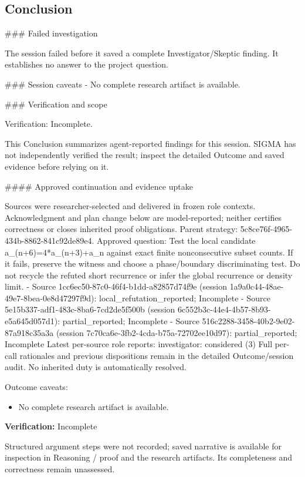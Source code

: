 \documentclass[11pt]{article}
\begin{document}
\subsection{Conclusion}
\#\#\# Failed investigation

The session failed before it saved a complete Investigator/Skeptic finding. It establishes no answer to the project question.

\#\#\# Session caveats
- No complete research artifact is available.

\#\#\# Verification and scope

Verification: Incomplete.

This Conclusion summarizes agent-reported findings for this session. SIGMA has not independently verified the result; inspect the detailed Outcome and saved evidence before relying on it.

\#\#\#\# Approved continuation and evidence uptake

Sources were researcher-selected and delivered in frozen role contexts. Acknowledgment and plan change below are model-reported; neither certifies correctness or closes inherited proof obligations.
Parent strategy: 5c8ce76f-4965-434b-8862-841c92de89e4. Approved question: Test the local candidate a\_(n+6)=4*a\_(n+3)+a\_n against exact finite nonconsecutive subset counts. If it fails, preserve the witness and choose a phase/boundary discriminating test. Do not recycle the refuted short recurrence or infer the global recurrence or density limit.
- Source 1cc6ec50-87c0-46f4-b1dd-a82857d74f9e (session 1a9a0c44-48ae-49e7-8bea-0e8d47297f9d): local\_refutation\_reported; Incomplete
- Source 5e15b337-adf1-483c-8ba6-7cd2de5f500b (session 6c552b3c-44e4-4b57-8b93-e5a645d057d1): partial\_reported; Incomplete
- Source 516c2288-3458-40b2-9e02-87a918c35a3a (session 7c70ca6e-3fb2-4cda-b75a-72702ee10d97): partial\_reported; Incomplete
Latest per-source role reports: investigator: considered (3)
Full per-call rationales and previous dispositions remain in the detailed Outcome/session audit. No inherited duty is automatically resolved.\par
Outcome caveats:\par
\begin{itemize}
\item No complete research artifact is available.
\end{itemize}
\textbf{Verification:} Incomplete\par
Structured argument steps were not recorded; saved narrative is available for inspection in Reasoning / proof and the research artifacts. Its completeness and correctness remain unassessed.\par
\end{document}
